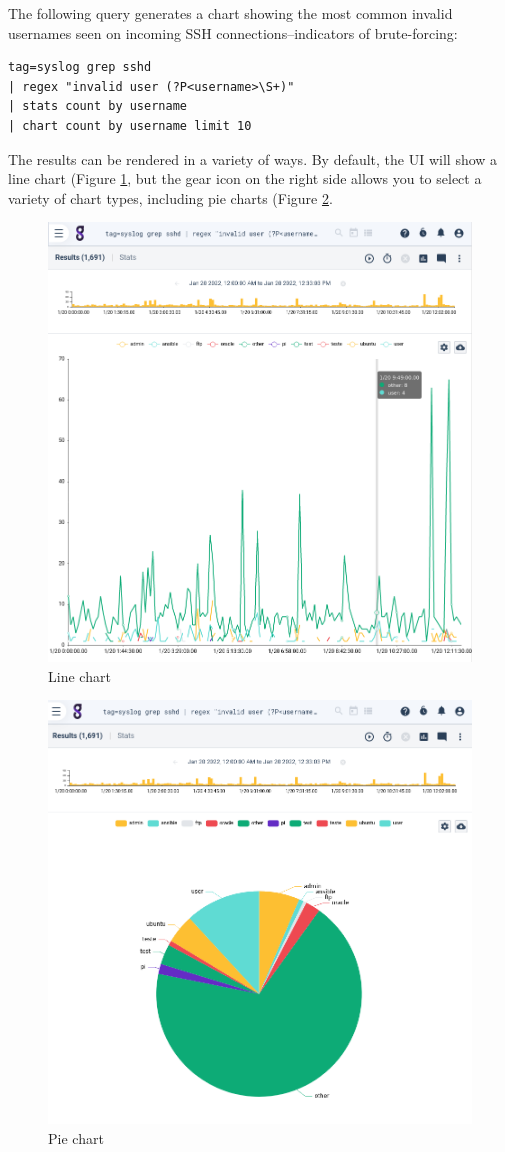 The following query generates a chart showing the most common invalid usernames seen on incoming SSH connections--indicators of brute-forcing:

\begin{Verbatim}[breaklines=true]
tag=syslog grep sshd 
| regex "invalid user (?P<username>\S+)" 
| stats count by username 
| chart count by username limit 10
\end{Verbatim}

The results can be rendered in a variety of ways. By default, the UI will show a line chart (Figure \ref{fig:chart-line}, but the gear icon on the right side allows you to select a variety of chart types, including pie charts (Figure \ref{fig:chart-pie}.

\begin{figure}
	\includegraphics[width=0.6\linewidth]{images/chart-line.png}
	\caption{Line chart}
	\label{fig:chart-line}
\end{figure}

\begin{figure}
	\includegraphics[width=0.6\linewidth]{images/chart-pie.png}
	\caption{Pie chart}
	\label{fig:chart-pie}
\end{figure}


